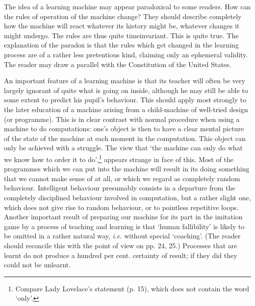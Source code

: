 \documentclass[12pt]{article}
\begin{document}
    The idea of a learning machine may appear paradoxical to some readers. How can the rules of operation of the machine change? They should describe completely how the machine will react whatever its history might be, whatever changes it might undergo. The rules are thus quite timeinvariant. This is quite true. The explanation of the paradox is that the rules which get changed in the learning process are of a rather less pretentious kind, claiming only an ephemeral validity. The reader may draw a parallel with the Constitution of the United States.

    An important feature of a learning machine is that its teacher will often be very largely ignorant of quite what is going on inside, although he may still be able to some extent to predict his pupil's behaviour. This should apply most strongly to the later education of a machine arising from a child-machine of well-tried design (or programme). This is in clear contrast with normal procedure when using a machine to do computations: one's object is then to have a clear mental picture of the state of the machine at each moment in the computation. This object can only be achieved with a struggle. The view that ‘the machine can only do what we know how to order it to do',\footnote[1]{Compare Lady Lovelace's statement (p. 15), which does not contain the word ‘only'.} appears strange in face of this. Most of the programmes which we can put into the machine will result in its doing something that we cannot make sense of at all, or which we regard as completely random behaviour. Intelligent behaviour presumably consists in a departure from the completely disciplined behaviour involved in computation, but a rather slight one, which does not give rise to random behaviour, or to pointless repetitive loops. Another important result of preparing our machine for its part in the imitation game by a process of teaching and learning is that ‘human fallibility' is likely to be omitted in a rather natural way, \textit{i.e.} without special ‘coaching'. (The reader should reconcile this with the point of view on pp. 24, 25.) Processes that are learnt do not produce a hundred per cent. certainty of result; if they did they could not be unlearnt.
\end{document}
